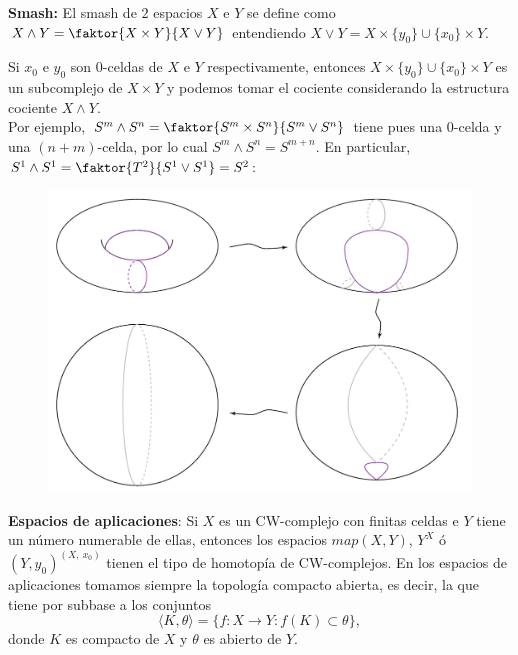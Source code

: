 \textbf{Smash:} El smash de $2$ espacios $X$ e $Y$  se define como $X \wedge Y = \faktor{X \times Y}{X \vee Y}$ entendiendo $X \vee Y = X \times \{y_0\} \cup \{x_0\} \times Y$. \par 
Si $x_0$ e $y_0$ son $0$-celdas de $X$ e $Y$ respectivamente, entonces $X \times \{y_0\} \cup \{x_0\} \times Y$ es un subcomplejo de $X \times Y$ y podemos tomar el cociente considerando la estructura cociente $X \wedge Y$. \\
Por ejemplo, $S^m \wedge S^n = \faktor{S^m \times S^n}{S^m \vee S^n}$ tiene pues una $0$-celda y una $(n+m)$-celda, por lo cual $S^m \wedge S^n = S^{m+n}$. En particular, $S^1 \wedge S^1 = \faktor{T^2}{S^1 \vee S^1} = S^2$: \par 
\begin{figure}[h]
\centering
\includegraphics[width = 0.6\linewidth]{images/smashs2}
\end{figure}

\textbf{Espacios de aplicaciones}: Si $X$ es un CW-complejo con finitas celdas e $Y$ tiene un número numerable de ellas, entonces los espacios
$map(X,Y)$, $Y^X$ ó $(Y, y_0)^{(X, \ x_0)}$ tienen el tipo de homotopía de CW-complejos. En los espacios de aplicaciones tomamos siempre la topología compacto abierta, es decir, la que tiene por subbase a los conjuntos 
\[ \langle K, \theta \rangle = \{f:X \longrightarrow Y : f(K) \subset \theta \}, \]
donde $K$ es compacto de $X$ y $\theta$ es abierto de $Y$.

